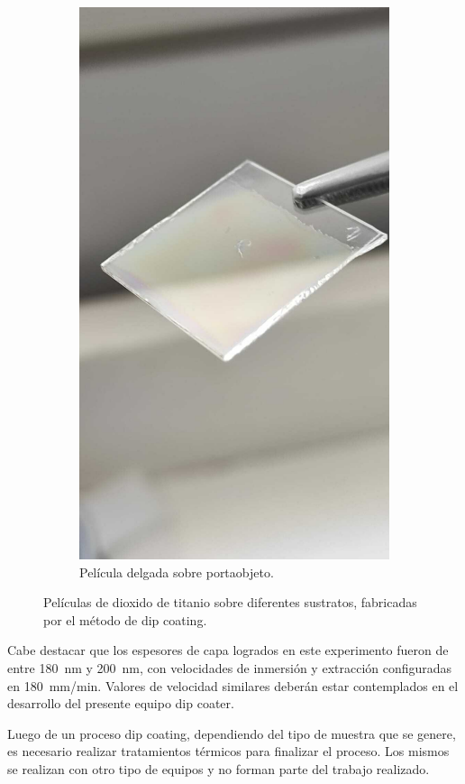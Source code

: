 \begin{figure}[!htpb]
\begin{subfigure}[b]{0.4\textwidth}
         \includegraphics[width=.7\textwidth]{./Figures/muestra_2.pdf}
         \caption{Película delgada sobre portaobjeto.}
         \label{fig:muestra_"}
     \end{subfigure}
     \hfill
        \caption{Películas de dioxido de titanio  sobre diferentes sustratos, fabricadas por el método de dip coating\protect\footnotemark.}
        \label{fig:muestras}
\end{figure}



Cabe destacar que los espesores de capa logrados en este experimento fueron de entre \SI{180}{nm} y \SI{200}{nm}, con velocidades de inmersión y extracción configuradas en \SI{180}{mm/min}. Valores de velocidad similares deberán estar contemplados en el desarrollo del presente equipo dip coater.

Luego de un proceso dip coating, dependiendo del tipo de muestra que se genere, es necesario realizar tratamientos térmicos para finalizar el proceso. Los mismos se realizan con otro tipo de equipos y no forman parte del trabajo realizado.
 
